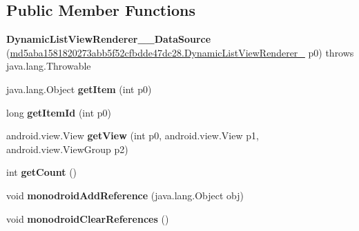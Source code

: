 \subsection*{Public Member Functions}
\begin{DoxyCompactItemize}
\item 
\hypertarget{classmd5aba1581820273abb5f52cfbdde47dc28_1_1DynamicListViewRenderer__1__DataSource_a0626e8fd44c4b3fe48747b74c8f0e158}{}{\bfseries Dynamic\+List\+View\+Renderer\+\_\+\_\+\+Data\+Source} (\hyperlink{classmd5aba1581820273abb5f52cfbdde47dc28_1_1DynamicListViewRenderer__1}{md5aba1581820273abb5f52cfbdde47dc28.\+Dynamic\+List\+View\+Renderer\+\_} p0)  throws java.\+lang.\+Throwable 	\label{classmd5aba1581820273abb5f52cfbdde47dc28_1_1DynamicListViewRenderer__1__DataSource_a0626e8fd44c4b3fe48747b74c8f0e158}

\item 
\hypertarget{classmd5aba1581820273abb5f52cfbdde47dc28_1_1DynamicListViewRenderer__1__DataSource_a74b3d3adaef0ca6a9eb8cfa04a6a9e40}{}java.\+lang.\+Object {\bfseries get\+Item} (int p0)\label{classmd5aba1581820273abb5f52cfbdde47dc28_1_1DynamicListViewRenderer__1__DataSource_a74b3d3adaef0ca6a9eb8cfa04a6a9e40}

\item 
\hypertarget{classmd5aba1581820273abb5f52cfbdde47dc28_1_1DynamicListViewRenderer__1__DataSource_a166c2630ac29f1685c440f4098069e67}{}long {\bfseries get\+Item\+Id} (int p0)\label{classmd5aba1581820273abb5f52cfbdde47dc28_1_1DynamicListViewRenderer__1__DataSource_a166c2630ac29f1685c440f4098069e67}

\item 
\hypertarget{classmd5aba1581820273abb5f52cfbdde47dc28_1_1DynamicListViewRenderer__1__DataSource_a44e605155c71bf756e3e9659661fddf2}{}android.\+view.\+View {\bfseries get\+View} (int p0, android.\+view.\+View p1, android.\+view.\+View\+Group p2)\label{classmd5aba1581820273abb5f52cfbdde47dc28_1_1DynamicListViewRenderer__1__DataSource_a44e605155c71bf756e3e9659661fddf2}

\item 
\hypertarget{classmd5aba1581820273abb5f52cfbdde47dc28_1_1DynamicListViewRenderer__1__DataSource_a6f300a8b7a91a19dcd1b9186377a099c}{}int {\bfseries get\+Count} ()\label{classmd5aba1581820273abb5f52cfbdde47dc28_1_1DynamicListViewRenderer__1__DataSource_a6f300a8b7a91a19dcd1b9186377a099c}

\item 
\hypertarget{classmd5aba1581820273abb5f52cfbdde47dc28_1_1DynamicListViewRenderer__1__DataSource_a7bc92fb8f5995ca65fe28b495eba9495}{}void {\bfseries monodroid\+Add\+Reference} (java.\+lang.\+Object obj)\label{classmd5aba1581820273abb5f52cfbdde47dc28_1_1DynamicListViewRenderer__1__DataSource_a7bc92fb8f5995ca65fe28b495eba9495}

\item 
\hypertarget{classmd5aba1581820273abb5f52cfbdde47dc28_1_1DynamicListViewRenderer__1__DataSource_a490eeae3eb697cb8fba8008489ff5fc6}{}void {\bfseries monodroid\+Clear\+References} ()\label{classmd5aba1581820273abb5f52cfbdde47dc28_1_1DynamicListViewRenderer__1__DataSource_a490eeae3eb697cb8fba8008489ff5fc6}

\end{DoxyCompactItemize}



